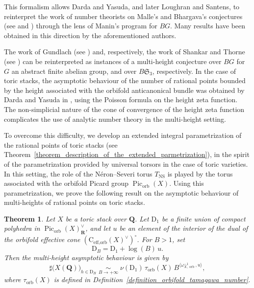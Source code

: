 \documentclass{proc-l}
\newcommand{\R}{\mathbf{R}}
\newcommand{\Q}{\mathbf{Q}}
\newcommand{\coneorb}{\text{C}_{\text{eff},\text{orb}}(X)}
\DeclareMathOperator{\Pic}{Pic}
\DeclareMathOperator{\NS}{NS}
\DeclareMathOperator{\orb}{orb}
\newcommand{\w}{\omega}
\newtheorem{theorem}{Theorem}[section]
\theoremstyle{definition}
\theoremstyle{remark}
\numberwithin{equation}{section}
\begin{document}
This formalism allows Darda and Yasuda, and later Loughran and Santens, to reinterpret the work of number theorists on Malle's and Bhargava's conjectures (see \cite{Malle2002,Malle2004} and \cite{bhargava_mass_formula}) through the lens of Manin's program for $B G$. Many results have been obtained in this direction by the aforementioned authors.


The work of Gundlach (see \cite{gundlach2022mallesconjecturemultipleinvariants}) and, respectively, the work of Shankar and Thorne (see \cite{shankar2024asymptoticscubicfieldsordered}) can be reinterpreted as instances of a multi-height conjecture over $B G$ for $G$ an abstract finite abelian group, and over $B \mathfrak{S}_3$, respectively. In the case of toric stacks, the asymptotic behaviour of the number of rational points bounded by the height associated with the orbifold anticanonical bundle was obtained by Darda and Yasuda in \cite[Theorem 1.3.1]{darda_yasuda_toric_stacks_batyrev}, using the Poisson formula on the height zeta function. The non-simplicial nature of the cone of convergence of the height zeta function complicates the use of analytic number theory in the multi-height setting.


To overcome this difficulty, we develop an extended integral parametrization of the rational points of toric stacks (see Theorem~\ref{theorem_description_of_the_extended_parmetrization}), in the spirit of the parametrization provided by universal torsors in the case of toric varieties. In this setting, the role of the Néron--Severi torus $T_{\NS}$ is played by the torus associated with the orbifold Picard group $\Pic_{\orb}(X)$. Using this parametrization, we prove the following result on the asymptotic behaviour of multi-heights of rational points on toric stacks.

\begin{theorem}
Let $X$ be a toric stack over $\Q$. Let $\mathrm{D}_1$ be a finite union of compact polyhedra in $\Pic_{\orb}(X)^{\vee}_{\R}$, and let $u$ be an element of the interior of the dual of the orbifold effective cone $(\coneorb^{\vee})^{\circ}$. For $B > 1$, set
\[
\mathrm{D}_B = \mathrm{D}_1 + \log(B)\, u.
\]
Then the multi-height asymptotic behaviour is given by
\[
\sharp\bigl( X(\Q) \bigr)_{h \in \mathrm{D}_B}
\;\underset{B \to +\infty}{\sim}\;
\nu(\mathrm{D}_1)\, \tau_{\orb}(X)\,
B^{\langle \w_{X,\orb}^{-1}, u \rangle},
\]
where $\tau_{\orb}(X)$ is defined in Definition~\ref{definition_orbifold_tamagawa_number}.
\end{theorem}
\end{document}
